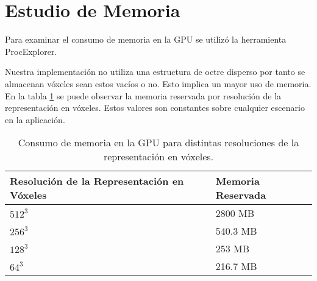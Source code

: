 \section{Estudio de Memoria}
Para examinar el consumo de memoria en la \ac{GPU} se utilizó la herramienta ProcExplorer.

Nuestra implementación no utiliza una estructura de octre disperso por tanto se almacenan vóxeles sean estos vacíos o no. Esto implica un mayor uso de memoria. En la tabla \ref{tab:memory} se puede observar la memoria reservada por resolución de la representación en vóxeles. Estos valores son constantes sobre cualquier escenario en la aplicación.
\begin{table}[H]
	\centering
	\begin{tabular}{ll}
	Resolución de la Representación en Vóxeles & Memoria Reservada             \\ \hline
	\multicolumn{1}{|l|}{$512^3$}                  & \multicolumn{1}{l|}{2800 MB}  \\
	\multicolumn{1}{|l|}{$256^3$}                  & \multicolumn{1}{l|}{540.3 MB} \\
	\multicolumn{1}{|l|}{$128^3$}                  & \multicolumn{1}{l|}{253 MB}   \\
	\multicolumn{1}{|l|}{$64^3$}                   & \multicolumn{1}{l|}{216.7 MB} \\ \hline
	\end{tabular}
	\caption{Consumo de memoria en la \ac{GPU} para distintas resoluciones de la representación en vóxeles.}
	\label{tab:memory}
\end{table}

